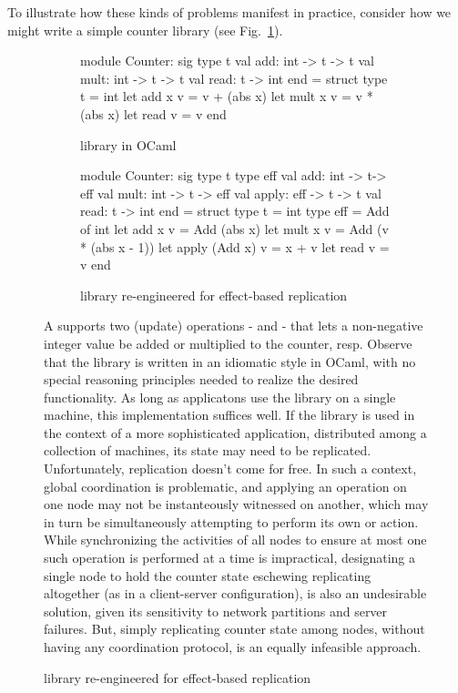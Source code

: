 To illustrate how these kinds of problems manifest in practice,
consider how we might write a simple counter library (see
Fig.~\ref{fig:counter-adt}).
\begin{figure}
\begin{subfigure}[b]{0.4\textwidth}
  \begin{ocaml}
    module Counter: sig
      type t
      val add: int -> t -> t
      val mult: int -> t -> t
      val read: t -> int
    end = struct
      type t = int
      let add x v = v + (abs x)
      let mult x v = v * (abs x)
      let read v = v
    end
  \end{ocaml}

\caption{ library in OCaml}
\label{fig:counter-adt}
\end{subfigure}
\begin{subfigure}[b]{0.56\textwidth}
  \begin{ocaml}
    module Counter: sig
      type t
      type eff 
      val add: int -> t-> eff
      val mult: int -> t -> eff
      val apply: eff -> t -> t
      val read: t -> int
    end = struct
      type t = int
      type eff = Add of int
      let add x v = Add (abs x)
      let mult x v = Add (v * (abs x - 1))
      let apply (Add x) v = x + v
      let read v = v
    end
  \end{ocaml}
\caption{ library re-engineered for effect-based replication}
\label{fig:counter-rdt}
\end{subfigure}
A  supports two (update) operations -  and 
- that lets a non-negative integer value be added or multiplied to the
counter, resp.  Observe that the library is written in an idiomatic
style in OCaml, with no special reasoning principles needed to realize
the desired functionality.  As long as applicatons use the library on
a single machine, this implementation suffices well.  If the library
is used in the context of a more sophisticated application,
distributed among a collection of machines, its state may need to be
replicated.  Unfortunately, replication doesn't come for free.  In
such a context, global coordination is problematic, and applying an
 operation on one node may not be instanteously witnessed on
another, which may in turn be simultaneously attempting to perform its
own  or  action.  While synchronizing the activities of
all nodes to ensure at most one such operation is performed at a time
is impractical, designating a single node to hold the counter state
eschewing replicating altogether (as in a client-server
configuration), is also an undesirable solution, given its sensitivity
to network partitions and server failures.  But, simply replicating
counter state among nodes, without having any coordination protocol,
is an equally infeasible approach.


\end{figure}
